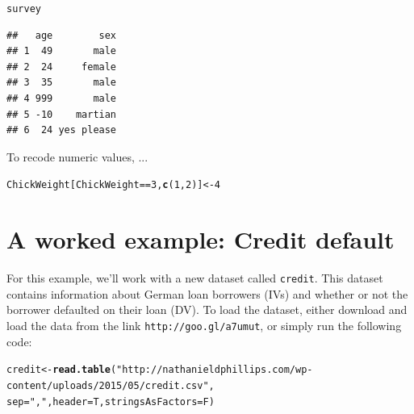 \documentclass{tufte-book}\usepackage[]{graphicx}\usepackage[]{color}
\makeatletter
\newcommand{\hlnum}[1]{\textcolor[rgb]{0.686,0.059,0.569}{#1}}%
\newcommand{\hlstr}[1]{\textcolor[rgb]{0.192,0.494,0.8}{#1}}%
\newcommand{\hlopt}[1]{\textcolor[rgb]{0,0,0}{#1}}%
\newcommand{\hlstd}[1]{\textcolor[rgb]{0.345,0.345,0.345}{#1}}%
\newcommand{\hlkwb}[1]{\textcolor[rgb]{0.69,0.353,0.396}{#1}}%
\newcommand{\hlkwc}[1]{\textcolor[rgb]{0.333,0.667,0.333}{#1}}%
\newcommand{\hlkwd}[1]{\textcolor[rgb]{0.737,0.353,0.396}{\textbf{#1}}}%
\newenvironment{kframe}{%
 \def\at@end@of@kframe{}%
 \ifinner\ifhmode%
  \def\at@end@of@kframe{\end{minipage}}%
  \begin{minipage}{\columnwidth}%
 \fi\fi%
 \def\FrameCommand##1{\hskip\@totalleftmargin \hskip-\fboxsep
 \colorbox{shadecolor}{##1}\hskip-\fboxsep
     \hskip-\linewidth \hskip-\@totalleftmargin \hskip\columnwidth}%
 \MakeFramed {\advance\hsize-\width
   \@totalleftmargin\z@ \linewidth\hsize
   \@setminipage}}%
 {\par\unskip\endMakeFramed%
 \at@end@of@kframe}
\newenvironment{knitrout}{}{} %
\makeatother
\begin{document}
\begin{footnotesize}
\begin{knitrout}
\begin{kframe}
\begin{alltt}
\hlstd{survey}
\end{alltt}
\begin{verbatim}
##   age        sex
## 1  49       male
## 2  24     female
## 3  35       male
## 4 999       male
## 5 -10    martian
## 6  24 yes please
\end{verbatim}
\end{kframe}
\end{knitrout}

To recode numeric values, ...




\begin{knitrout}
\color{fgcolor}\begin{kframe}
\begin{alltt}
\hlstd{ChickWeight[ChickWeight} \hlopt{==} \hlnum{3}\hlstd{,} \hlkwd{c}\hlstd{(}\hlnum{1}\hlstd{,} \hlnum{2}\hlstd{)]} \hlkwb{<-} \hlnum{4}
\end{alltt}


{\ttfamily\noindent\bfseries\color{errorcolor}{\#\# Error in `[<-.data.frame`(`*tmp*`, ChickWeight == 3, c(1, 2), value = 4): non-existent rows not allowed}}\end{kframe}
\end{knitrout}




\section{A worked example: Credit default}

For this example, we'll work with a new dataset called \texttt{credit}. This dataset contains information about German loan borrowers (IVs) and whether or not the borrower defaulted on their loan (DV). To load the dataset, either download and load the data from the link \texttt{http://goo.gl/a7umut}, or simply run the following code:




\begin{footnotesize}
\begin{knitrout}
\color{fgcolor}\begin{kframe}
\begin{alltt}
\hlstd{credit} \hlkwb{<-} \hlkwd{read.table}\hlstd{(}\hlstr{"http://nathanieldphillips.com/wp-content/uploads/2015/05/credit.csv"}\hlstd{,}
                     \hlkwc{sep} \hlstd{=} \hlstr{","}\hlstd{,} \hlkwc{header} \hlstd{= T,} \hlkwc{stringsAsFactors} \hlstd{= F)}
\end{alltt}
\end{kframe}
\end{knitrout}
\end{footnotesize}


\end{footnotesize}
\end{document}
